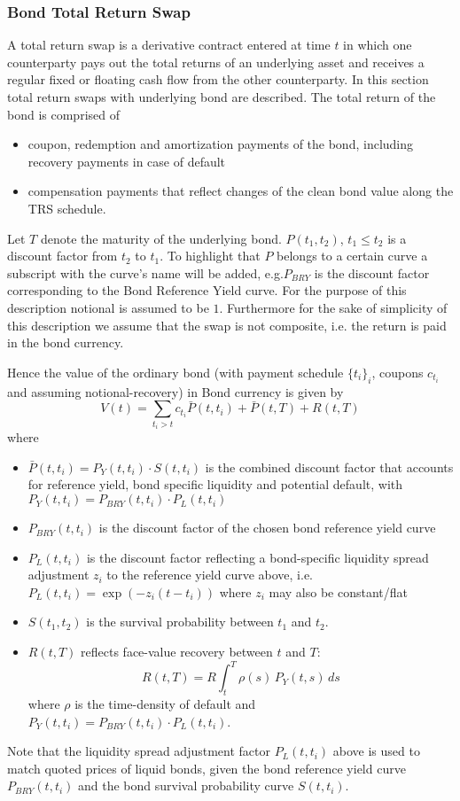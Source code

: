 \subsubsection{Bond Total Return Swap}


A total return swap is a derivative contract entered at time $t$ in
which one counterparty pays out the total returns of an underlying
asset and receives a regular fixed or floating cash flow from the
other counterparty. In this section total return swaps with underlying
bond are described. The total return of the bond is comprised of
%
\begin{itemize}
\item coupon, redemption and amortization payments of the bond,
  including  recovery payments in case of default
\item compensation payments that reflect changes of the clean bond
  value along the TRS schedule.
\end{itemize}
Let $T$ denote the maturity of the underlying bond. $P(t_1,t_2)$,
$t_1\leq t_2$ is a discount factor from $t_2$ to $t_1$. To highlight
that $P$ belongs to a certain curve a subscript with the curve's name
will be added, e.g.$P_{BRY}$ is the discount factor corresponding to
the Bond Reference Yield curve. For the purpose of this description
notional is assumed to be $1$. Furthermore for the sake of simplicity
of this description we assume that the swap is not composite, i.e. the
return is paid in the bond currency.

Hence the value of the ordinary bond (with payment schedule
$\{t_i\}_i$, coupons $c_{t_i}$ and assuming notional-recovery) in Bond
currency is given by
\begin{equation}
V(t)=\sum_{t_i>t}c_{t_i}{\bar P}(t,t_i)+{\bar P}(t,T)+R(t,T)
\label{bondprice}
\end{equation}
where 
\begin{itemize}
\item $\bar{P}(t,t_i)=P_Y(t,t_i)\cdot S(t,t_i)$ is
  the combined discount factor that accounts for reference yield,
  bond specific liquidity and  potential default, with
  $P_Y(t,t_i)=P_{BRY}(t,t_i)\cdot P_L(t,t_i)$ 
\item $P_{BRY}(t,t_i)$ is the discount factor of the chosen bond reference
  yield curve 
\item $P_L(t,t_i)$ is the discount factor reflecting a
  bond-specific liquidity spread adjustment $z_i$ to the reference
  yield curve  above, i.e.~$P_L(t,t_i)=\exp(-z_i(t-t_i))$ where $z_i$
  may also be constant/flat
\item $S(t_1,t_2)$ is the survival
  probability between $t_1$ and $t_2$.
\item $R(t,T)$ reflects face-value recovery between $t$ and
  $T$: 
  $$R(t,T)=R\int_{t}^T\rho(s)\,P_{Y}(t,s) \,ds$$ 
  where $\rho$ is the time-density of default and  
  $P_Y(t,t_i)=P_{BRY}(t,t_i)\cdot P_L(t,t_i)$.
\end{itemize}
Note that the liquidity spread adjustment factor $P_L(t,t_i)$  above
is used to match quoted prices of liquid bonds, given the bond
reference yield curve $P_{BRY}(t,t_i)$ and the bond survival
probability curve $S(t,t_i)$. 

